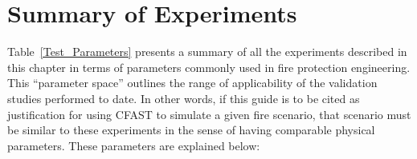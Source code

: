 \section{Summary of Experiments}

\label{experiment_summary}

Table~\ref{Test_Parameters} presents a summary of all the experiments described in this chapter in terms of parameters commonly used in fire protection engineering. This ``parameter space'' outlines the range of applicability of the validation studies performed to date. In other words, if this guide is to be cited as justification for using CFAST to simulate a given fire scenario, that scenario must be similar to these experiments in the sense of having comparable physical parameters. These parameters are explained below:

